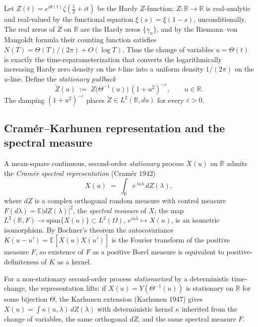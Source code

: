 \documentclass[11pt]{amsart}
\theoremstyle{definition}
\begin{document}
Let $Z(t)=e^{i\theta(t)}\zeta(\tfrac12+it)$ be the Hardy $Z$-function;
$Z\colon\mathbb{R}\to\mathbb{R}$ is real-analytic and real-valued by the
functional equation $\xi(s)=\xi(1-s)$, unconditionally. The real zeros of
$Z$ on $\mathbb{R}$ are the Hardy zeros $\{\gamma_{n}\}$, and by the
Riemann--von Mangoldt formula their counting function satisfies
$N(T)=\Theta(T)/(2\pi)+O(\log T)$. Thus the change of variables $u=\Theta(t)$
is exactly the time-reparameterization that converts the logarithmically
increasing Hardy zero density on the $t$-line into a uniform density
$1/(2\pi)$ on the $u$-line. Define the \emph{stationary pullback}
\[
\widetilde{Z}(u)\;:=\;Z\bigl(\Theta^{-1}(u)\bigr)\,(1+u^{2})^{-\varepsilon},\qquad u\in\mathbb{R}.
\]
The damping $(1+u^{2})^{-\varepsilon}$ places $\widetilde{Z}\in L^{2}(\mathbb{R},du)$
for every $\varepsilon>0$.

\subsection*{Cram\'er--Karhunen representation and the spectral measure}

A mean-square continuous, second-order \emph{stationary} process $X(u)$
on $\mathbb{R}$ admits the \emph{Cram\'er spectral representation}
(Cram\'er 1942)
\[
X(u)\;=\;\int_{\mathbb{R}}e^{\,iu\lambda}\,dZ(\lambda),
\]
where $dZ$ is a complex orthogonal random measure with control measure
$F(d\lambda)=\mathbb{E}|dZ(\lambda)|^{2}$, the \emph{spectral measure} of
$X$; the map $L^{2}(\mathbb{R},F)\to\overline{\mathrm{span}}\{X(u)\}
\subset L^{2}(\Omega)$, $e^{iu\lambda}\mapsto X(u)$, is an isometric
isomorphism. By Bochner's theorem the autocovariance
$K(u-u')=\mathbb{E}[X(u)\overline{X(u')}]$ is the Fourier transform of
the positive measure $F$, so existence of $F$ as a positive Borel measure
is equivalent to positive-definiteness of $K$ as a kernel.

For a non-stationary second-order process \emph{stationarized} by a
deterministic time-change, the representation lifts: if $X(u)=Y(\Theta^{-1}(u))$
is stationary on $\mathbb{R}$ for some bijection $\Theta$, the
Karhunen extension (Karhunen 1947) gives
$X(u)=\int\kappa(u,\lambda)\,dZ(\lambda)$ with deterministic kernel
$\kappa$ inherited from the change of variables, the same orthogonal
$dZ$, and the same spectral measure $F$.
\end{document}
